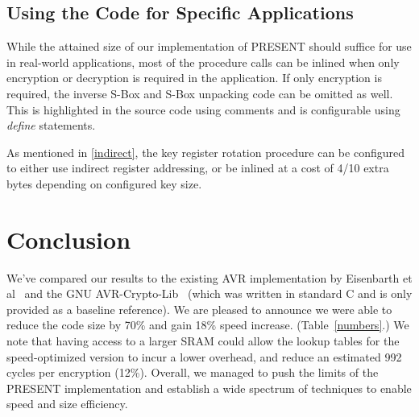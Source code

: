 \documentclass[11pt]{llncs2e} %
\begin{document}
\subsection{Using the Code for Specific Applications}
While the attained size of our implementation of PRESENT should suffice for use in real-world applications, most of the procedure calls can be inlined when only encryption or decryption is required in the application.
If only encryption is required, the inverse S-Box and  S-Box unpacking code can be omitted as well.
This is highlighted in the source code using comments and is configurable using \textit{define} statements.


As mentioned in \ref{indirect}, the key register rotation procedure can be configured to either use indirect register addressing, or be inlined at a cost of 4/10 extra bytes depending on configured key size.

\section{Conclusion}
We've compared our results to the existing AVR implementation by Eisenbarth et al~\cite{eisenbarth2012compact} and the GNU AVR-Crypto-Lib~\cite{avr_crypto_lib} (which was written in standard C and is only provided as a baseline reference).
We are pleased to announce we were able to reduce the code size by 70\% and gain 18\% speed increase. (Table~\ref{numbers}.)
We note that having access to a larger SRAM could allow the lookup tables for the speed-optimized version to incur a lower overhead, and reduce an estimated 992 cycles per encryption (12\%). 
Overall, we managed to push the limits of the PRESENT implementation and establish a wide spectrum of techniques to enable speed and size efficiency.
\newcommand{\specialcell}[2][c]{%
  \begin{tabular}[#1]{@{}c@{}}#2\end{tabular}}
\end{document}
